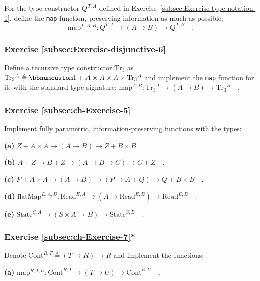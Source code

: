 For the type constructor $Q^{T,A}$ defined in Exercise~\ref{subsec:Exercise-type-notation-1},
define the \lstinline!map! function, preserving information as much
as possible:
\[
\text{map}^{T,A,B}:Q^{T,A}\rightarrow\left(A\rightarrow B\right)\rightarrow Q^{T,B}\quad.
\]


\subsubsection{Exercise \label{subsec:Exercise-disjunctive-6}\ref{subsec:Exercise-disjunctive-6}}

Define a recursive type constructor $\text{Tr}_{3}$ as $\text{Tr}_{3}{}^{A}\triangleq\bbnum 1+A\times A\times A\times\text{Tr}_{3}{}^{A}$
and implement the \lstinline!map! function for it, with the standard
type signature: $\text{map}^{A,B}:\text{Tr}_{3}{}^{A}\rightarrow\left(A\rightarrow B\right)\rightarrow\text{Tr}_{3}{}^{B}\quad.$

\subsubsection{Exercise \label{subsec:ch-Exercise-5}\ref{subsec:ch-Exercise-5}}

Implement fully parametric, information-preserving functions with
the types:

\textbf{(a)} $Z+A\times A\rightarrow(A\rightarrow B)\rightarrow Z+B\times B\quad.$

\textbf{(b)} $A+Z\rightarrow B+Z\rightarrow(A\rightarrow B\rightarrow C)\rightarrow C+Z\quad.$

\textbf{(c)} $P+A\times A\rightarrow(A\rightarrow B)\rightarrow(P\rightarrow A+Q)\rightarrow Q+B\times B\quad.$

\textbf{(d)} $\text{flatMap}^{E,A,B}:\text{Read}^{E,A}\rightarrow(A\rightarrow\text{Read}^{E,B})\rightarrow\text{Read}^{E,B}\quad.$

\textbf{(e)} $\text{State}^{S,A}\rightarrow\left(S\times A\rightarrow B\right)\rightarrow\text{State}^{S,B}\quad.$

\subsubsection{Exercise \label{subsec:ch-Exercise-7}\ref{subsec:ch-Exercise-7}{*}}

Denote $\text{Cont}^{R,T}\triangleq\left(T\rightarrow R\right)\rightarrow R$
and implement the functions:

\textbf{(a)} $\text{map}^{R,T,U}:\text{Cont}^{R,T}\rightarrow(T\rightarrow U)\rightarrow\text{Cont}^{R,U}\quad.$

